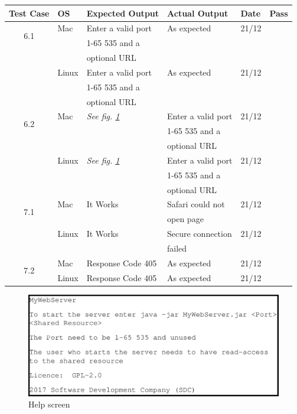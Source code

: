\documentclass[a4paper, 12pt]{article}
\newcommand{\cmark}{\ding{51}}%
\newcommand{\xmark}{\ding{55}}%
\begin{document}
\begin{tabular}{| c | l | l | l | l | c |}
\hline

Test Case 		& OS		& Expected Output		& Actual Output		& Date		& Pass		\\ \hline
\multirow{2}{*}{6.1}	& Mac		& Enter a valid port		& As expected		& 21/12		& \cmark	\\
			&		& 1-65 535 and a 		&			&		&		\\
			&		& optional URL			&			&		&		\\
\cline{2-6}		& Linux		& Enter a valid port		& As expected		& 21/12		& \cmark	\\
			&		& 1-65 535 and a 		&			&		&		\\
			&		& optional URL			&			&		&		\\ \hline
\multirow{2}{*}{6.2}	& Mac		& \textit{See fig. \ref{HSc}}	& Enter a valid port	& 21/12		& \xmark	\\
			&		&				& 1-65 535 and a	&		&		\\
			&		&				& optional URL		&		&		\\
\cline{2-6}		& Linux		& \textit{See fig. \ref{HSc}}	& Enter a valid port	& 21/12		& \xmark	\\ 	
			&		&				& 1-65 535 and a	&		&		\\
			&		&				& optional URL		&		&		\\ \hline
\multirow{2}{*}{7.1}	& Mac		& It Works			& Safari could not	& 21/12		& \xmark	\\
			&		&				& open page		&		&		\\
\cline{2-6}		& Linux		& It Works			& Secure connection	& 21/12		& \xmark	\\ 
			&		&				& failed		&		&		\\ \hline
\multirow{2}{*}{7.2}	& Mac		& Response Code 405		& As expected		& 21/12		& \cmark	\\
\cline{2-6}		& Linux		& Response Code 405		& As expected		& 21/12		& \cmark	\\ \hline	
\end{tabular}

\begin{figure}[H]
\centering
\includegraphics[scale=0.5]{help_screen.png}
\caption{Help screen}
\label{HSc}
\end{figure}
\newpage
\end{document}
